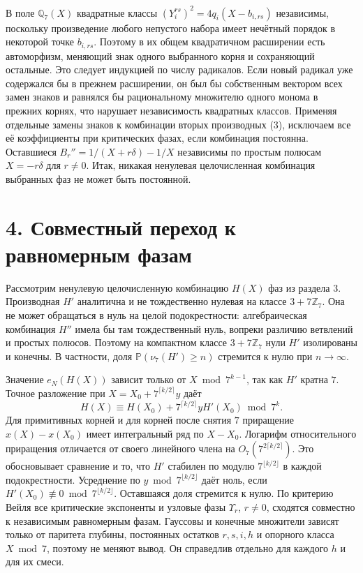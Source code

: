 \documentclass[11pt,a4paper]{article}
\newcommand{\sect}[1]{\section*{\sffamily\color{ink}#1}}
\newcommand{\Zp}{\mathbb Z_7}
\newcommand{\Qp}{\mathbb Q_7}
\begin{document}
В поле \(\Qp(X)\) квадратные классы \((Y_i^{rs})^2=4q_i(X-b_{i,rs})\) независимы, поскольку произведение любого непустого набора имеет нечётный порядок в некоторой точке \(b_{i,rs}\). Поэтому в их общем квадратичном расширении есть автоморфизм, меняющий знак одного выбранного корня и сохраняющий остальные. Это следует индукцией по числу радикалов. Если новый радикал уже содержался бы в прежнем расширении, он был бы собственным вектором всех замен знаков и равнялся бы рациональному множителю одного монома в прежних корнях, что нарушает независимость квадратных классов. Применяя отдельные замены знаков к комбинации вторых производных (3), исключаем все её коэффициенты при критических фазах, если комбинация постоянна. Оставшиеся \(B_r''=1/(X+r\delta)-1/X\) независимы по простым полюсам \(X=-r\delta\) для \(r\ne0\). Итак, никакая ненулевая целочисленная комбинация выбранных фаз не может быть постоянной.
\newpage
\sect{4. Совместный переход к равномерным фазам}
Рассмотрим ненулевую целочисленную комбинацию \(H(X)\) фаз из раздела 3. Производная \(H'\) аналитична и не тождественно нулевая на классе \(3+7\Zp\). Она не может обращаться в нуль на целой подокрестности: алгебраическая комбинация \(H''\) имела бы там тождественный нуль, вопреки различию ветвлений и простых полюсов. Поэтому на компактном классе \(3+7\Zp\) нули \(H'\) изолированы и конечны. В частности, доля \(\mathbb P(\nu_7(H')\ge n)\) стремится к нулю при \(n\to\infty\).

Значение \(e_N(H(X))\) зависит только от \(X\bmod7^{k-1}\), так как \(H'\) кратна \(7\). Точное разложение при \(X=X_0+7^{\lceil k/2\rceil}y\) даёт
\[
  H(X)\equiv H(X_0)+7^{\lceil k/2\rceil}y H'(X_0)\bmod7^k .
\]
Для примитивных корней и для корней после снятия \(7\) приращение \(x(X)-x(X_0)\) имеет интегральный ряд по \(X-X_0\). Логарифм относительного приращения отличается от своего линейного члена на \(O_7(7^{2\lceil k/2\rceil})\). Это обосновывает сравнение и то, что \(H'\) стабилен по модулю \(7^{\lfloor k/2\rfloor}\) в каждой подокрестности. Усреднение по \(y\bmod7^{\lfloor k/2\rfloor}\) даёт ноль, если \(H'(X_0)\not\equiv0\bmod7^{\lfloor k/2\rfloor}\). Оставшаяся доля стремится к нулю. По критерию Вейля все критические экспоненты и узловые фазы \(\Upsilon_r\), \(r\ne0\), сходятся совместно к независимым равномерным фазам. Гауссовы и конечные множители зависят только от паритета глубины, постоянных остатков \(r,s,i,h\) и опорного класса \(X\bmod7\), поэтому не меняют вывод. Он справедлив отдельно для каждого \(h\) и для их смеси.
\end{document}
